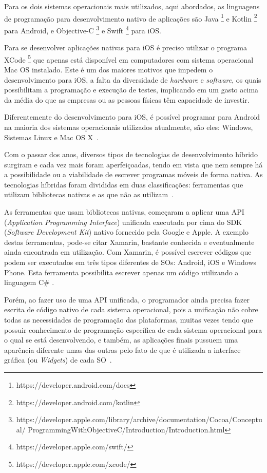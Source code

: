 Para os dois sistemas operacionais mais utilizados, aqui abordados, as linguagens de programação para desenvolvimento nativo de aplicações são Java \footnote{https://developer.android.com/docs} e Kotlin \footnote{https://developer.android.com/kotlin} para Android, e Objective-C \footnote{https://developer.apple.com/library/archive/documentation/Cocoa/Conceptual/ \newline ProgrammingWithObjectiveC/Introduction/Introduction.html} e Swift \footnote{https://developer.apple.com/swift/} para iOS\@.


Para se desenvolver aplicações nativas para iOS é preciso utilizar o programa XCode \footnote{https://developer.apple.com/xcode/} que apenas está disponível em computadores com sistema operacional Mac OS instalado\cite{goadrich2011smart}.
Este é um dos maiores motivos que impedem o desenvolvimento para iOS, a falta da diversidade de \textit{hardware} e \textit{software}, os quais possibilitam a programação e execução de testes, implicando em um gasto acima da média do que as empresas ou as pessoas físicas têm capacidade de investir.

Diferentemente do desenvolvimento para iOS, é possível programar para Android na maioria dos sistemas operacionais utilizados atualmente, são eles: Windows, Sistemas Linux e Mac OS X~\cite{goadrich2011smart}.


Com o passar dos anos, diversos tipos de tecnologias de desenvolvimento híbrido surgiram e cada vez mais foram aperfeiçoadas, tendo em vista que nem sempre há a possibilidade ou a viabilidade de escrever programas móveis de forma nativa.
As tecnologias híbridas foram divididas em duas classificações: ferramentas que utilizam bibliotecas nativas e as que não as utilizam~\cite{clow2019flutter}.

As ferramentas que usam bibliotecas nativas, começaram a aplicar uma API (\textit{Application Programming Interface}) unificada executada por cima do SDK (\textit{Software Development Kit}) nativo fornecido pela Google e Apple.
A exemplo destas ferramentas, pode-se citar Xamarin, bastante conhecida e eventualmente ainda encontrada em utilização.
Com Xamarin, é possível escrever códigos que podem ser executados em três tipos diferentes de SOs: Android, iOS e Windows Phone.
Esta ferramenta possibilita escrever apenas um código utilizando a linguagem C\# \cite{petzold2015xamarin}.

Porém, ao fazer uso de uma API unificada, o programador ainda precisa fazer escrita de código nativo de cada sistema operacional, pois a unificação não cobre todas as necessidades de programação das plataformas, muitas vezes tendo que possuir conhecimento de programação específica de cada sistema operacional para o qual se está desenvolvendo, e também, as aplicações finais pussuem uma aparência diferente umas das outras pelo fato de que é utilizada a interface gráfica (ou \textit{Widgets}) de cada SO~\cite{clow2019flutter}.


